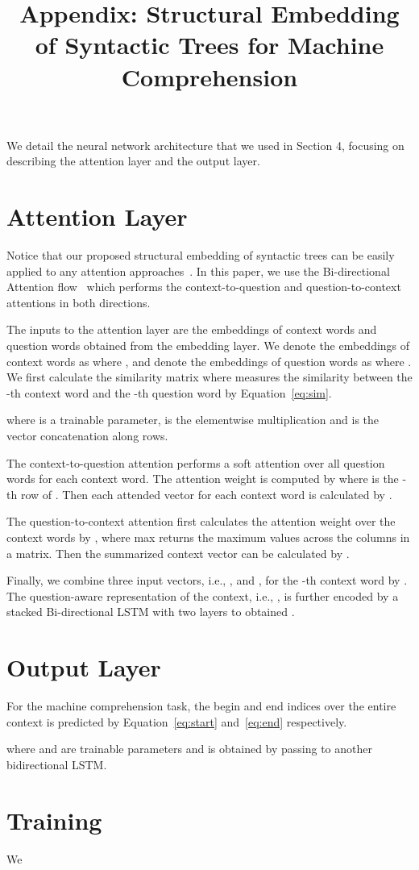 \documentclass[11pt,letterpaper]{article}
\title{ Appendix: Structural Embedding of Syntactic Trees for Machine Comprehension }
\date{}
\begin{document}
\maketitle

We detail the neural network architecture that we used in Section 4, focusing on describing the attention layer and the output layer.

\section{Attention Layer}
Notice that our proposed structural embedding of syntactic trees can be easily applied to any attention approaches~\cite{xiong2016dynamic,seo2016bidirectional,wang2016multi,wang2016machine}. In this paper, we use the Bi-directional Attention flow~\cite{seo2016bidirectional} which performs the context-to-question and question-to-context attentions in both directions.

The inputs to the attention layer are the embeddings of context words and question words obtained from the embedding layer.  We denote the embeddings of  context words as  where , and denote the embeddings of  question words as  where . We first calculate the similarity matrix  where  measures the similarity between the -th context word and the -th question word by Equation~\ref{eq:sim}. 


where  is a trainable parameter,  is the elementwise multiplication and  is the vector concatenation along rows.

The context-to-question attention performs a soft attention over all question words for each context word. The attention weight is computed by  where  is the -th row of . Then each attended vector for each context word is calculated by .

The question-to-context attention first calculates the attention weight over the context words by , where max returns the maximum values across the columns in a matrix. Then the summarized context vector can be calculated by .  

Finally, we combine three input vectors, i.e., ,  and , for the -th context word by . The question-aware representation of the context, i.e., , is further encoded by a stacked Bi-directional LSTM with two layers to obtained .

\section{Output Layer}
For the machine comprehension task, the begin and end indices over the entire context is predicted by Equation~\ref{eq:start} and~\ref{eq:end} respectively. 

where  and  are trainable parameters and  is obtained by passing  to another bidirectional LSTM.

\section{Training}
We 


\end{document}
